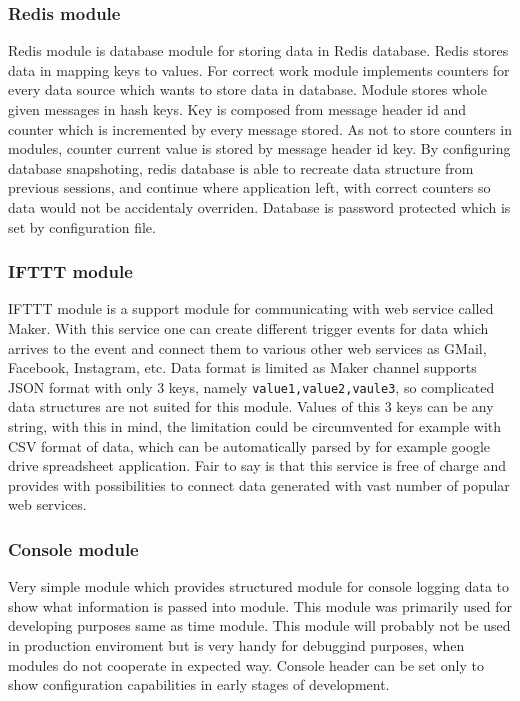 \subsubsection{Redis module} %
\label{ssub:redis_module}
Redis module is database module for storing data in Redis database. Redis stores data in mapping keys to values. For correct work module implements counters for every data source which wants to store data in database. Module stores whole given messages in hash keys. Key is composed from message header id and counter which is incremented by every message stored. As not to store counters in modules, counter current value is stored by message header id key. By configuring database snapshoting, redis database is able to recreate data structure from previous sessions, and continue where application left, with correct counters so data would not be accidentaly overriden. Database is password protected which is set by configuration file.
\subsubsection{IFTTT module} %
\label{ssub:ifttt_module}
IFTTT module is a support module for communicating with web service called Maker. With this service one can create different trigger events for data which arrives to the event and connect them to various other web services as GMail, Facebook, Instagram, etc. Data format is limited as Maker channel supports JSON format with only 3 keys, namely \verb|value1,value2,vaule3|, so complicated data structures are not suited for this module. Values of this 3 keys can be any string, with this in mind, the limitation could be circumvented for example with CSV format of data, which can be automatically parsed by for example google drive spreadsheet application. Fair to say is that this service is free of charge and provides with possibilities to connect data generated with vast number of popular web services.
\subsubsection{Console module} %
\label{ssub:console_module}
Very simple module which provides structured module for console logging data to show what information is passed into module. This module was primarily used for developing purposes same as time module. This module will probably not be used in production enviroment but is very handy for debuggind purposes, when modules do not cooperate in expected way. Console header can be set only to show configuration capabilities in early stages of development.
